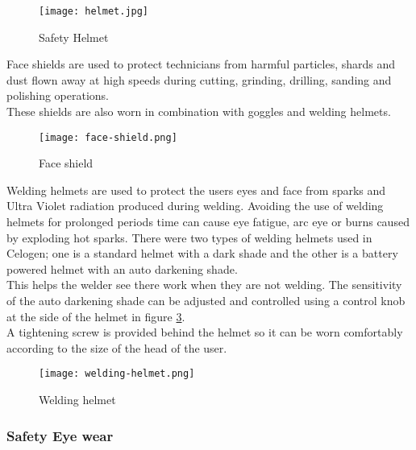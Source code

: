\documentclass[a4paper,12pt]{article}
\begin{document}
						\begin{figure}[H]
							\begin{center}				
								\texttt{[image: helmet.jpg]}
							\end{center}
							\caption{Safety Helmet}
							\label{fig:Safety Helmet}
						\end{figure}
						
						Face shields are used to protect technicians from harmful particles, shards and dust flown away at high speeds during cutting, grinding, drilling, sanding and polishing operations.\\
						These shields are also worn in combination with goggles and welding helmets.\\

						\begin{figure}[H]
							\begin{center}				
								\texttt{[image: face-shield.png]}
							\end{center}
							\caption{Face shield}
							\label{fig:Face shield}
						\end{figure}
						
						Welding helmets are used to protect the users eyes and face from sparks and Ultra Violet radiation produced during welding.
						Avoiding the use of welding helmets for prolonged periods time can cause eye fatigue, arc eye or burns caused by exploding hot sparks.   
						There were two types of welding helmets used in Celogen; one is a standard helmet with a dark shade and the other is a battery powered helmet with an auto darkening shade.\\
						This helps the welder see there work when they are not welding.
						The sensitivity of the auto darkening shade can be adjusted and controlled using a control knob at the side of the helmet in figure \ref{fig:Welding helmet}.\\
				A tightening screw is provided behind the helmet so it can be worn comfortably according to the size of the head of the user. 		
						
						\begin{figure}[H]
							\centering				
							\texttt{[image: welding-helmet.png]}
							\caption{Welding helmet}
							\label{fig:Welding helmet}
						\end{figure}
					\subsubsection*{Safety Eye wear}
					
\end{document}
